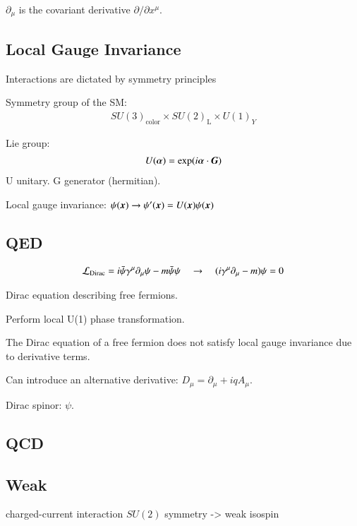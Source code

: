 $\partial_{\mu}$ is the covariant derivative $\partial / \partial x^{\mu}$.




\subsection{Local Gauge Invariance}

Interactions are dictated by symmetry principles


Symmetry group of the SM:
\begin{align*}
  SU(3)_{\text{color}} \times SU(2)_{\text{L}} \times U(1)_{Y}
\end{align*}

Lie group:
\begin{align*}
  U(\myvec{\alpha}) = \exp(i \myvec{\alpha} \cdot \myvec{G})
\end{align*}
U unitary. G generator (hermitian).


Local gauge invariance:
$\psi(\myvec{x}) \to \psi^\prime(\myvec{x}) = U(\myvec{x}) \psi(\myvec{x})$


\subsection{QED}

\begin{align*}
  \mathcal{L}_{\text{Dirac}} = i \bar{\psi} \gamma^{\mu} \partial_{\mu} \psi - m \bar{\psi} \psi \quad \to \quad (i \gamma^{\mu} \partial_{\mu} - m) \psi = 0
\end{align*}

Dirac equation describing free fermions.

Perform local U(1) phase transformation.

The Dirac equation of a free fermion does not satisfy local gauge invariance due
to derivative terms.

Can introduce an alternative derivative: $D_\mu = \partial_\mu + i q A_\mu$.

Dirac spinor: $\psi$.


\subsection{QCD}

\subsection{Weak}

charged-current interaction $SU(2)$ symmetry -> weak isospin

